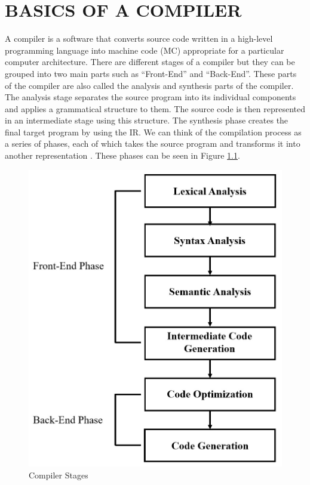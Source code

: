 \clearpage
\chapter{BASICS OF A COMPILER}\label{Ch2}
A compiler is a software that converts source code written in a high-level programming language into machine code (MC) appropriate for a particular computer architecture.
There are different stages of a compiler but they can be grouped into two main parts such as “Front-End” and “Back-End”. %
These parts of the compiler are also called the analysis and synthesis parts of the compiler. The analysis stage separates the source program into its individual components and applies a grammatical structure to them. The source code is then represented in an intermediate stage using this structure. The synthesis phase creates the final target program by using the IR. We can think of the compilation process as a series of phases, each of which takes the source program and transforms it into another representation \cite{compileralfredaho}. These phases can be seen in Figure \ref{fig:comp_stages}.
\begin{figure}
    \centering
    \includegraphics[scale=0.25]{basics_of_compiler/comp_stages.jpeg}
    \caption{Compiler Stages}
    \label{fig:comp_stages}
\end{figure}


